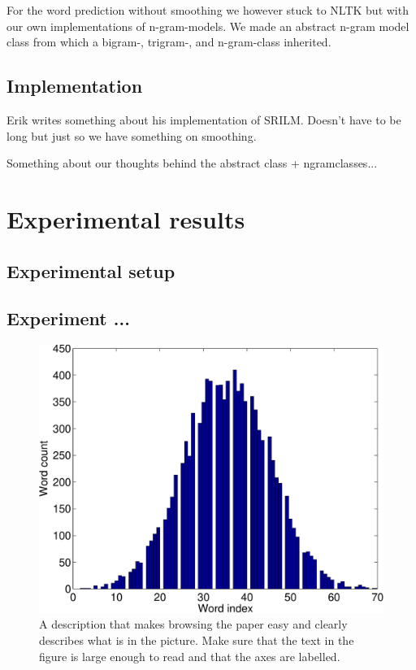 \documentclass[a4paper,12pt]{article}
\begin{document}
For the word prediction without smoothing we however stuck to NLTK but with our own implementations of n-gram-models. We made an abstract n-gram model class from which a bigram-, trigram-, and n-gram-class inherited.

\subsection{Implementation}
\label{sec:impl}

Erik writes something about his implementation of SRILM. Doesn't have to be long but just so we have something on smoothing.

Something about our thoughts behind the abstract class + ngramclasses...

\section{Experimental results}
\label{sec:exps}

\subsection{Experimental setup}

\subsection{Experiment ...}

\begin{figure}
\centering
\includegraphics[width=0.8\linewidth]{histogram}
\caption{A description that makes browsing the paper easy and clearly 
describes what is in the picture. Make sure that the text in the figure 
is large enough to read and that the axes are labelled.}
\label{fig:histogram}
\end{figure}
\end{document}
